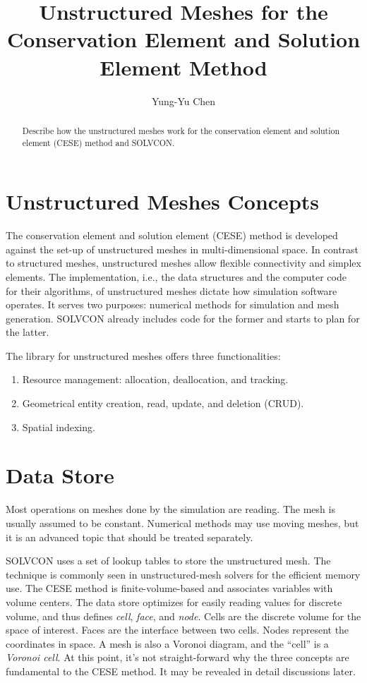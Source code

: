 \documentclass[11pt,dvips]{article}
\title{
%
Unstructured Meshes for the Conservation Element and Solution Element Method
%
}
\author{
%
Yung-Yu Chen
%
}
\numberwithin{equation}{section}
\begin{document}
\maketitle

\begin{abstract}
%
Describe how the unstructured meshes work for the conservation element and
solution element (CESE) method and SOLVCON.
%
\end{abstract}

\section{Unstructured Meshes Concepts}
%
\label{s:concept}

The conservation element and solution element (CESE) method is developed
against the set-up of unstructured meshes in multi-dimensional
space\cite{mavriplis_unstructured_1997, wang_2d_1999}.  In contrast to
structured meshes, unstructured meshes allow flexible connectivity and simplex
elements.  The implementation, i.e., the data structures and the computer code
for their algorithms, of unstructured meshes dictate how simulation software
operates.  It serves two purposes: numerical methods for simulation and mesh
generation.  SOLVCON already includes code for the former and starts to plan
for the latter.

The library for unstructured meshes offers three functionalities:
%
\begin{enumerate}
%
\item Resource management: allocation, deallocation, and tracking.
%
\item Geometrical entity creation, read, update, and deletion (CRUD).
%
\item Spatial indexing.
%
\end{enumerate}

\clearpage
%
\section{Data Store}
%
\label{s:storage}

Most operations on meshes done by the simulation are reading.  The mesh is
usually assumed to be constant.  Numerical methods may use moving meshes, but
it is an advanced topic that should be treated separately.

SOLVCON uses a set of lookup tables to store the unstructured mesh.  The
technique is commonly seen in unstructured-mesh solvers for the efficient
memory use.  The CESE method is finite-volume-based and associates variables
with volume centers.  The data store optimizes for easily reading values for
discrete volume, and thus defines \textit{cell}, \textit{face}, and
\textit{node}.  Cells are the discrete volume for the space of interest.  Faces
are the interface between two cells.  Nodes represent the coordinates in space.
A mesh is also a Voronoi diagram, and the ``cell'' is a \textit{Voronoi
cell}\cite{berg_computational_2010}.  At this point, it's not straight-forward
why the three concepts are fundamental to the CESE method.  It may be revealed
in detail discussions later.
\end{document}
